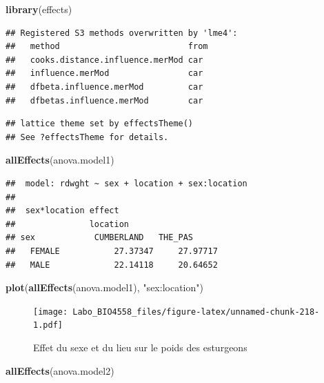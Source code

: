 \documentclass[
  12pt,
]{book}
\newenvironment{Shaded}{\begin{snugshade}}{\end{snugshade}}
\newcommand{\KeywordTok}[1]{\textcolor[rgb]{0.13,0.29,0.53}{\textbf{#1}}}
\newcommand{\NormalTok}[1]{#1}
\newcommand{\StringTok}[1]{\textcolor[rgb]{0.31,0.60,0.02}{#1}}
\begin{document}
\begin{Shaded}
\begin{Highlighting}[]
\KeywordTok{library}\NormalTok{(effects)}
\end{Highlighting}
\end{Shaded}

\begin{verbatim}
## Registered S3 methods overwritten by 'lme4':
##   method                          from
##   cooks.distance.influence.merMod car 
##   influence.merMod                car 
##   dfbeta.influence.merMod         car 
##   dfbetas.influence.merMod        car
\end{verbatim}

\begin{verbatim}
## lattice theme set by effectsTheme()
## See ?effectsTheme for details.
\end{verbatim}

\begin{Shaded}
\begin{Highlighting}[]
\KeywordTok{allEffects}\NormalTok{(anova.model1)}
\end{Highlighting}
\end{Shaded}

\begin{verbatim}
##  model: rdwght ~ sex + location + sex:location
## 
##  sex*location effect
##               location
## sex            CUMBERLAND   THE_PAS     
##   FEMALE           27.37347     27.97717
##   MALE             22.14118     20.64652
\end{verbatim}

\begin{Shaded}
\begin{Highlighting}[]
\KeywordTok{plot}\NormalTok{(}\KeywordTok{allEffects}\NormalTok{(anova.model1), }\StringTok{"sex:location"}\NormalTok{)}
\end{Highlighting}
\end{Shaded}

\begin{figure}
\centering
\texttt{[image: Labo\_BIO4558\_files/figure-latex/unnamed-chunk-218-1.pdf]}
\caption{\label{fig:unnamed-chunk-218}Effet du sexe et du lieu sur le poids des esturgeons}
\end{figure}

\begin{Shaded}
\begin{Highlighting}[]
\KeywordTok{allEffects}\NormalTok{(anova.model2)}
\end{Highlighting}
\end{Shaded}
\end{document}

